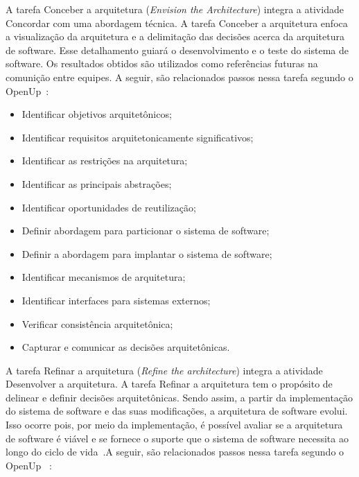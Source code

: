%


A tarefa Conceber a arquitetura (\emph{Envision the Architecture}) integra a atividade Concordar com uma abordagem técnica. A tarefa Conceber a arquitetura enfoca a visualização da arquitetura e a delimitação das decisões acerca da arquitetura de software. Esse detalhamento guiará o desenvolvimento e o teste do sistema de software. Os resultados obtidos são utilizados como referências futuras na comunição entre equipes. A seguir, são relacionados passos nessa tarefa segundo o OpenUp~\cite{openup}:

\begin{itemize}
    \item Identificar objetivos arquitetônicos;
    \item Identificar requisitos arquitetonicamente significativos;
    \item Identificar as restrições na arquitetura;
    \item Identificar as principais abstrações;
    \item Identificar oportunidades de reutilização;
    \item Definir abordagem para particionar o sistema de software;
    \item Definir a abordagem para implantar o sistema de software;
    \item Identificar mecanismos de arquitetura;
    \item Identificar interfaces para sistemas externos;
    \item Verificar consistência arquitetônica;
    \item Capturar e comunicar as decisões arquitetônicas.
\end{itemize}

A tarefa Refinar a arquitetura (\emph{Refine the architecture}) integra a atividade Desenvolver a arquitetura. A tarefa Refinar a arquitetura tem o propósito de delinear e definir decisões arquitetônicas. Sendo assim, a partir da implementação do sistema de software e das suas modificações, a arquitetura de software evolui. Isso ocorre pois, por meio da implementação, é possível avaliar se a arquitetura de software é viável e se fornece o suporte que o sistema de software necessita ao longo do ciclo de vida~\cite{openup}.A seguir, são relacionados passos nessa tarefa segundo o OpenUp ~\cite{openup}:

